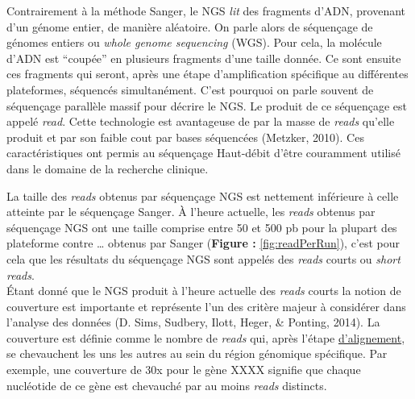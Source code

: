 \documentclass[12pt,twoside]{reedthesis}
\theoremstyle{definition}
\theoremstyle{definition}
\theoremstyle{remark}
\begin{document}
  Contrairement à la méthode Sanger, le NGS \emph{lit} des fragments
  d'ADN, provenant d'un génome entier, de manière aléatoire. On parle
  alors de séquençage de génomes entiers ou \emph{whole genome sequencing}
  (WGS). Pour cela, la molécule d'ADN est ``coupée'' en plusieurs
  fragments d'une taille donnée. Ce sont ensuite ces fragments qui seront,
  après une étape d'amplification spécifique au différentes plateformes,
  séquencés simultanément. C'est pourquoi on parle souvent de séquençage
  parallèle massif pour décrire le NGS. Le produit de ce séquençage est
  appelé \emph{read}. Cette technologie est avantageuse de par la masse de
  \emph{reads} qu'elle produit et par son faible cout par bases séquencées
  (Metzker, 2010). Ces caractéristiques ont permis au séquençage
  Haut-débit d'être couramment utilisé dans le domaine de la recherche
  clinique.
  
  La taille des \emph{reads} obtenus par séquençage NGS est nettement
  inférieure à celle atteinte par le séquençage Sanger. À l'heure
  actuelle, les \emph{reads} obtenus par séquençage NGS ont une taille
  comprise entre 50 et 500 pb pour la plupart des plateforme contre
  \ldots{} obtenus par Sanger (\textbf{Figure :} \ref{fig:readPerRun}),
  c'est pour cela que les résultats du séquençage NGS sont appelés des
  \emph{reads} courts ou \emph{short reads}.\\
  Étant donné que le NGS produit à l'heure actuelle des \emph{reads}
  courts la notion de couverture est importante et représente l'un des
  critère majeur à considérer dans l'analyse des données (D. Sims,
  Sudbery, Ilott, Heger, \& Ponting, 2014). La couverture est définie
  comme le nombre de \emph{reads} qui, après l'étape
  \protect\hyperlink{lalignement}{d'alignement}, se chevauchent les uns
  les autres au sein du région génomique spécifique. Par exemple, une
  couverture de 30x pour le gène XXXX signifie que chaque nucléotide de ce
  gène est chevauché par au moins \emph{reads} distincts.
  
\end{document}
